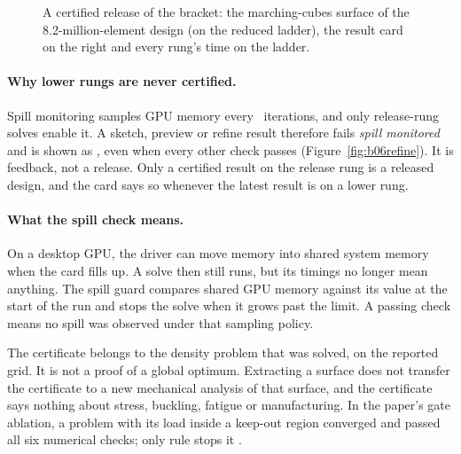 \begin{table}[htb]
\caption{The six certificate checks. A result is certified only when all six pass.}\label{tab:checks}

\end{table}

\begin{figure}[t]
\caption{A certified release of the bracket: the marching-cubes surface of the 8.2-million-element design (on the reduced
ladder), the result card on the right and every rung's time on the ladder.}
\label{fig:releasesurface}
\end{figure}

\paragraph{Why lower rungs are never certified.} Spill monitoring samples GPU memory every \SpillEvery\ iterations,
and only release-rung solves enable it. A sketch, preview or refine result therefore fails \emph{spill monitored} and is
shown as , even when every other check passes (Figure~\ref{fig:b06refine}). It is feedback, not a
release. Only a certified result on the release rung is a released design, and the card says so whenever the latest
result is on a lower rung.

\paragraph{What the spill check means.} On a desktop GPU, the driver can move memory into shared system memory when
the card fills up. A solve then still runs, but its timings no longer mean anything. The spill guard compares shared
GPU memory against its value at the start of the run and stops the solve when it grows past the limit. A passing
check means no spill was observed under that sampling policy.

\begin{notebox}
The certificate belongs to the density problem that was solved, on the reported grid. It is not a proof of a global
optimum. Extracting a surface does not transfer the certificate to a new mechanical analysis of that surface, and the
certificate says nothing about stress, buckling, fatigue or manufacturing. In the paper's gate ablation, a problem with
its load inside a keep-out region converged and passed all six numerical checks; only rule  stops it
.
\end{notebox}

